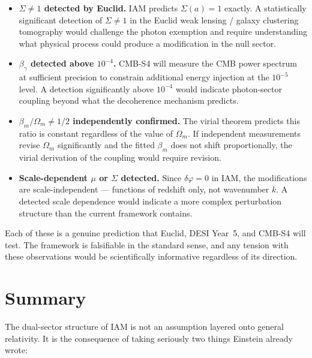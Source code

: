 \documentclass[12pt]{article}
\begin{document}
\begin{itemize}
\item \textbf{$\Sigma \neq 1$ detected by Euclid.} IAM predicts
  $\Sigma(a) = 1$ exactly. A statistically significant detection of
  $\Sigma \neq 1$ in the Euclid weak lensing / galaxy clustering
  tomography would challenge the photon exemption and require
  understanding what physical process could produce a modification
  in the null sector.

\item \textbf{$\beta_\gamma$ detected above $10^{-4}$.}
  CMB-S4 will measure the CMB power spectrum at sufficient precision
  to constrain additional energy injection at the $10^{-5}$ level.
  A detection significantly above $10^{-4}$ would indicate photon-sector
  coupling beyond what the decoherence mechanism predicts.

\item \textbf{$\beta_m/\Omega_m \neq 1/2$ independently confirmed.}
  The virial theorem predicts this ratio is constant regardless of
  the value of $\Omega_m$. If independent measurements revise $\Omega_m$
  significantly and the fitted $\beta_m$ does not shift proportionally,
  the virial derivation of the coupling would require revision.

\item \textbf{Scale-dependent $\mu$ or $\Sigma$ detected.}
  Since $\delta\varphi = 0$ in IAM, the modifications are
  scale-independent — functions of redshift only, not wavenumber $k$.
  A detected scale dependence would indicate a more complex perturbation
  structure than the current framework contains.
\end{itemize}

Each of these is a genuine prediction that Euclid, DESI Year~5, and
CMB-S4 will test. The framework is falsifiable in the standard sense,
and any tension with these observations would be scientifically
informative regardless of its direction.


\section{Summary}

The dual-sector structure of IAM is not an assumption layered onto
general relativity. It is the consequence of taking seriously two things
Einstein already wrote:
\end{document}

